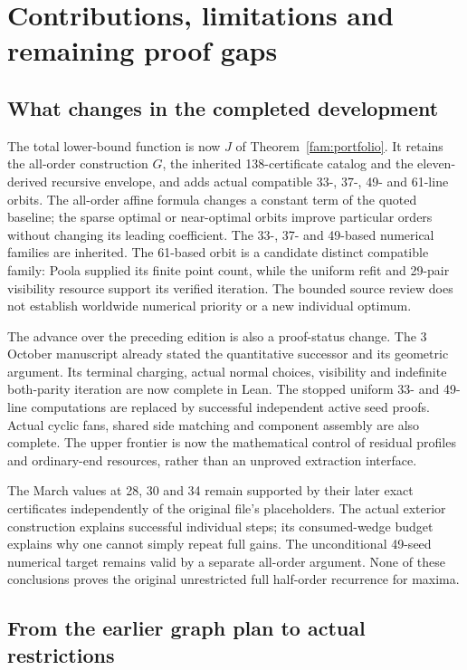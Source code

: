 \section{Contributions, limitations and remaining proof gaps}
\label{sec:discussion}

\subsection{What changes in the completed development}

The total lower-bound function is now $J$ of
Theorem~\ref{fam:portfolio}. It retains the all-order construction $G$,
the inherited 138-certificate catalog and the eleven-derived recursive
envelope, and adds actual compatible 33-, 37-, 49- and 61-line orbits.
The all-order affine formula changes a constant term of the quoted
baseline; the sparse optimal or near-optimal orbits improve particular
orders without changing its leading coefficient. The 33-, 37- and
49-based numerical families are inherited. The 61-based orbit is a
candidate distinct compatible family: Poola supplied its finite point
count, while the uniform refit and 29-pair visibility resource support
its verified iteration. The bounded source review does not establish
worldwide numerical priority or a new individual optimum.

The advance over the preceding edition is also a proof-status change.
The 3 October manuscript already stated the quantitative successor and
its geometric argument. Its terminal charging, actual normal choices,
visibility and indefinite both-parity iteration are now complete in
Lean. The stopped uniform 33- and 49-line computations are replaced by
successful independent active seed proofs. Actual cyclic fans, shared
side matching and component assembly are also complete. The upper
frontier is now the mathematical control of residual profiles and
ordinary-end resources, rather than an unproved extraction interface.

The March values at 28, 30 and 34 remain supported by their later exact
certificates independently of the original file's placeholders. The
actual exterior construction explains successful individual steps;
its consumed-wedge budget explains why one cannot simply repeat full
gains. The unconditional 49-seed numerical target remains valid by a
separate all-order argument. None of these conclusions proves the
original unrestricted full half-order recurrence for maxima.

\subsection{From the earlier graph plan to actual restrictions}
\label{sec:graph-plan}

